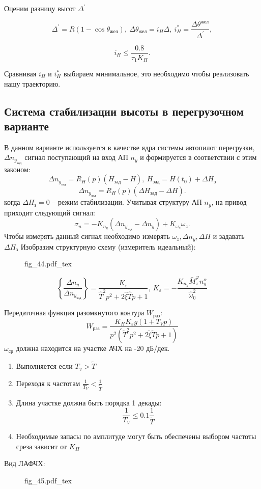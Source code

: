\documentclass{article}
\newcommand{\incfig}[1]{
    {#1.pdf_tex}
}
\begin{document}
Оценим разницу высот $\Delta^{'}$

\[
	\Delta^{'} = R(1 - \cos{\theta_\text{жел}}), \ \Delta \theta_\text{жел} =
	i_H \Delta, \ i_{H}^* = \frac{\Delta \theta^\text{жел}}{\Delta^{'}},
\]

\[
	i_H \le \frac{0.8}{\tau_1 K_H}
	.\]

Сравнивая $i_H$ и $i_H^*$ выбираем минимальное, это необходимо чтобы
реализовать нашу траекторию.

\subsection{Система стабилизации высоты в перегрузочном варианте}
В данном варианте используется в качестве ядра системы автопилот перегрузки, $
	\Delta n_{y_\text{зад}}$ сигнал поступающий на вход АП $n_y$ и формируется в
соответствии с этим законом:
\[
	\Delta n_{y_\text{зад}} = R_H(p) (H_\text{зад} - H), \ H_\text{зад} =
	H(t_0) + \Delta H_\text{з}
\]
\[
	\Delta n_{y_\text{зад}} = R_H(p) (\Delta H_\text{зад} - \Delta H)
	.\]
когда $\Delta H_\text{з} = 0$ -- режим стабилизации. Учитывая структуру АП
$n_y$, на привод приходит следующий сигнал:
\[
	\sigma_n = -K_{n_y} ( \Delta n_{y_\text{зад}} - \Delta n_y) + K_{\omega_z}
	\omega_z
	.\]
Чтобы измерять данный сигнал необходимо измерять $\omega_z, \Delta n_y, \Delta
	H$ и задавать $\Delta H_\text{з}$
Изобразим структурную схему (измеритель идеальный):
\begin{figure}[H]
	\centering
	\incfig{fig_44}
	\label{fig:fig_44}
\end{figure}
\[
	\left\{ \frac{ \Delta n_y}{ \Delta n_{y_\text{зад}}} \right\}  =
	\frac{K_\varepsilon}{ \hat{T}^2 p^2 + 2 \hat{\xi} \hat{T}p + 1 }, \
	K_\varepsilon = - \frac{K_{n_y} \bar{M}_z^{\varphi} n_y^\alpha
	}{\hat{\omega}_0^2}
\]

Передаточная функция разомкнутого контура $W_\text{раз}$:
\[
	W_\text{раз}  = \frac{K_H K_\varepsilon g (1 + T_V p)}{p^2 (\tilde{T}^2 p^2
		+ 2 \tilde{\xi} \tilde{T}p + 1)}
\]
$\omega_\text{ср}$ должна находится на участке АЧХ на -20 дБ/дек.
\begin{enumerate}
	\item Выполняется если $T_v > \tilde{T}$
	\item Переходя к частотам $\frac{1}{T_V} < \frac{1}{\tilde{T}}$
	\item Длина участке должна быть порядка 1 декады:
	      \[
		      \frac{1}{T_V} \le 0.1 \frac{1}{\tilde{T}}
	      \]
	\item Необходимые запасы по амплитуде могут быть обеспечены выбором частоты
	      среза зависит от $K_H$
\end{enumerate}
Вид ЛАФЧХ:
\begin{figure}[H]
	\centering
	\incfig{fig_45}
	\label{fig:fig_45}
\end{figure}
\end{document}
